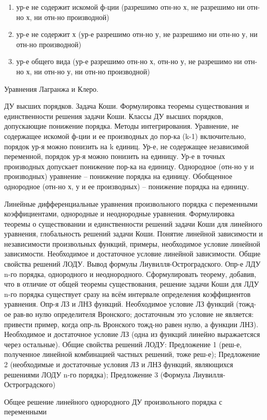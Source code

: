 \documentclass{article}
\newcounter{ticket}[subsection]
\newcounter{Ticket}[subsection]
\newcommand{\Ticket}[1][]{\item[Билет \ifthenelse{\equal{#1}{}}{}{\setcounter{ticket}{#1}}\theticket\refstepcounter{ticket}:]}
\begin{document}
\begin{description}
\begin{enumerate}
		\item ур-е не содержит искомой ф-ции (разрешимо отн-но х, не разрешимо ни отн-но х, ни отн-но производной)
		\item ур-е не содержит х (ур-е разрешимо отн-но у, не разрешимо ни отн-но у, ни отн-но производной)
		\item ур-е общего вида (ур-е разрешимо отн-но х, отн-но у, не разрешимо ни отн-но х, ни отн-но у, ни отн-но производной)
	\end{enumerate}
	\Ticket Уравнения Лагранжа и Клеро.
	\Ticket ДУ высших порядков. Задача Коши. Формулировка теоремы существования и единственности
	решения задачи Коши. Классы ДУ высших порядков, допускающие понижение порядка. Методы
	интегрирования.
	Уравнение, не содержащее искомой ф-ции и ее производных до пор-ка (k-1) включительно, порядок ур-я
	можно понизить на k единиц. Ур-е, не содержащее независимой переменной, порядок ур-я можно понизить
	на единицу. Ур-е в точных производных допускает понижение пор-ка на единицу. Однородное (отн-но у и
	производных) уравнение – понижение порядка на единицу. Обобщенное однородное (отн-но х, у и ее
	производных) – понижение порядка на единицу.
	\Ticket Линейные дифференциальные уравнения произвольного порядка с переменными
	коэффициентами, однородные и неоднородные уравнения. Формулировка теоремы о существовании
	и единственности решений задачи Коши для линейного уравнения, глобальность решений задачи
	Коши. Понятие линейной зависимости и независимости произвольных функций, примеры,
	необходимое условие линейной зависимости. Необходимое и достаточное условие линейной
	зависимости. Общие свойства решений ЛОДУ. Вывод формулы Лиувилля-Остроградского.
	Опр-е ЛДУ n-го порядка, однородного и неоднородного. Сформулировать теорему, добавив, что в отличие
	от общей теоремы существования, решение задачи Коши для ЛДУ n-го порядка существует сразу на всём
	интервале определения коэффициентов уравнения. Опр-я ЛЗ и ЛНЗ функций. Необходимое условие ЛЗ
	функций (тожд-ое рав-во нулю определителя Вронского; достаточным это условие не является: привести
	пример, когда опр-ль Вронского тожд-но равен нулю, а функции ЛНЗ). Необходимое и достаточное условие
	ЛЗ (одна из функций линейно выражаетсяся через остальные). Общие свойства решений ЛОДУ:
	Предложение 1 (реш-е, полученное линейной комбинацией частных решений, тоже реш-е); Предложение 2
	(необходимые и достаточные условия ЛЗ и ЛНЗ функций, являющихся решениями ЛОДУ n-го порядка);
	Предложение 3 (Формула Лиувилля-Остроградского)
	\Ticket Общее решение линейного однородного ДУ произвольного порядка с переменными

\end{description}
\end{document}
